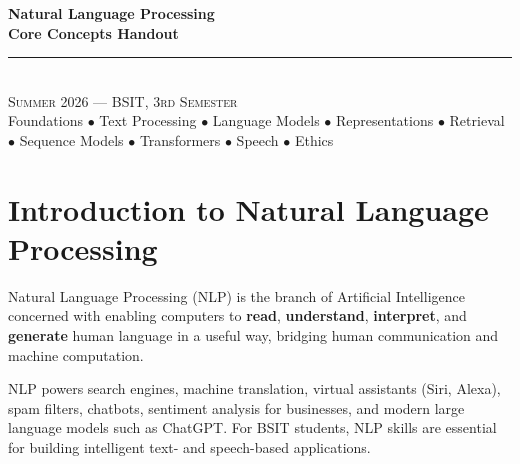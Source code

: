 \documentclass[11pt,a4paper]{article}
\begin{document}
\begin{center}
\vspace*{0.5cm}
{\Huge\bfseries\textcolor{primary}{Natural Language Processing}}\\[8pt]
{\Huge\bfseries\textcolor{primary}{Core Concepts Handout}}\\[16pt]
{\color{secondary}\rule{0.68\textwidth}{1.5pt}}\\[14pt]
{\Large\textsc{Summer 2026 --- BSIT, 3rd Semester}}\\[8pt]
{\large\textcolor{gray!70!black}{Foundations $\bullet$ Text Processing $\bullet$ Language Models $\bullet$ Representations $\bullet$ Retrieval $\bullet$ Sequence Models $\bullet$ Transformers $\bullet$ Speech $\bullet$ Ethics}}
\vspace{0.3cm}
\end{center}

\tableofcontents
\newpage

\section{Introduction to Natural Language Processing}

\begin{definitionbox}
Natural Language Processing (NLP) is the branch of Artificial Intelligence concerned with enabling computers to \textbf{read}, \textbf{understand}, \textbf{interpret}, and \textbf{generate} human language in a useful way, bridging human communication and machine computation.
\end{definitionbox}

\begin{conceptbox}
NLP powers search engines, machine translation, virtual assistants (Siri, Alexa), spam filters, chatbots, sentiment analysis for businesses, and modern large language models such as ChatGPT. For BSIT students, NLP skills are essential for building intelligent text- and speech-based applications.
\end{conceptbox}
\end{document}
